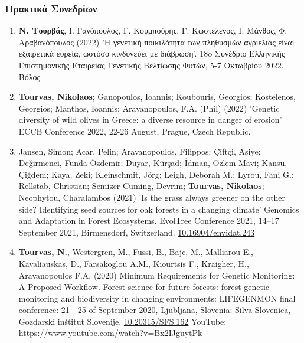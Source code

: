 \documentclass[12pt,]{scrartcl}
\begin{document}
\subsubsection{Πρακτικά Συνεδρίων}\label{conferences}

\vspace{-3mm}
\begin{enumerate}
\leftskip-0.13in
	\setcounter{enumi}{4}
	
\leftskip-0.07in  

\leftskip-0.07in  
\item \textbf{N. Τουρβάς}, Ι. Γανόπουλος, Γ. Κουμπούρης, Γ. Κωστελένος, Ι. Μάνθος, Φ. Αραβανόπουλος (2022) 'Η γενετική ποικιλότητα των πληθυσμών αγριελιάς είναι εξαιρετικά ευρεία,
ωστόσο κινδυνεύει με διάβρωση'. 18o Συνέδριο Ελληνικής Επιστημονικής Εταιρείας Γενετικής Βελτίωσης Φυτών, 5-7 Οκτωβρίου 2022, Βόλος

\item \textbf{Tourvas, Nikolaos}; Ganopoulos, Ioannis; Koubouris, Georgios; Kostelenos, Georgios; Manthos, Ioannis;
Aravanopoulos, F.A. (Phil) (2022) 'Genetic diversity of wild olives in Greece: a diverse resource in danger of erosion' ECCB Conference 2022, 22-26 August, Prague, Czech Republic.

\item Jansen, Simon; Acar, Pelin; Aravanopoulos, Filippos; Çiftçi, Asiye; Değirmenci, Funda Özdemir; Duyar, Kürşad; İdman, Özlem Mavi; Kansu, Çiğdem; Kaya, 
Zeki; Kleinschmit, Jörg; Leigh, Deborah M.; Lyrou, Fani G.; Rellstab, Christian; 
Semizer-Cuming, Devrim; \textbf{Tourvas, Nikolaos}; Neophytou, Charalambos (2021) 'Is the grass always greener on the other side? Identifying seed sources for oak forests in a changing climate' Genomics and Adaptation in Forest Ecosystems. EvolTree Conference 2021, 14–17 September 2021, Birmensdorf, Switzerland. \href{http://doi.org/10.16904/envidat.243}{10.16904/envidat.243}

\item \textbf{Tourvas, N.}, Westergren, M., Fussi,  B.,  Bajc,  M.,  Malliarou  E.,  Kavaliauskas,  D.,  Farsakoglou A.M., Kiourtsis F., Kraigher, H., Aravanopoulos F.A. (2020) Minimum Requirements for Genetic Monitoring: A Proposed Workflow. Forest science for future forests: forest genetic monitoring and biodiversity in changing environments: LIFEGENMON final conference: 21 - 25 of September 2020, Ljubljana, Slovenia: Silva Slovenica, Gozdarski inštitut Slovenije. 
\href{http://doi.org/10.20315/SFS.162}{10.20315/SFS.162}
\newline
YouTube: \href{https://www.youtube.com/watch?v=Bx2IJguytPk}{https://www.youtube.com/watch?v=Bx2IJguytPk}


\end{enumerate}
\end{document}
